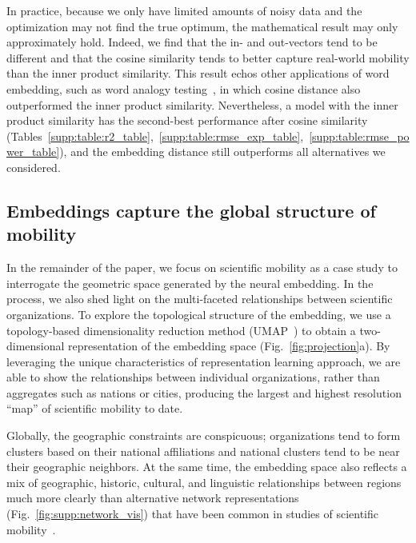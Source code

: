 \documentclass[12pt]{article} %
\begin{document}
In practice, because we only have limited amounts of noisy data and the optimization may not find the true optimum, the mathematical result may only approximately hold.
Indeed, we find that the in- and out-vectors tend to be different and that the cosine similarity tends to better capture real-world mobility than the inner product similarity.
This result echos other applications of word embedding, such as word analogy testing~\autocite{levy2015improving}, in which cosine distance also outperformed the inner product similarity.
Nevertheless, a model with the inner product similarity has the second-best performance after cosine similarity (Tables~\ref{supp:table:r2_table},~\ref{supp:table:rmse_exp_table},~\ref{supp:table:rmse_power_table}), and the embedding distance still outperforms all alternatives we considered.


\subsection*{Embeddings capture the global structure of mobility}

In the remainder of the paper, we focus on scientific mobility as a case study to interrogate the geometric space generated by the neural embedding.
In the process, we also shed light on the multi-faceted relationships between scientific organizations.
To explore the topological structure of the embedding, we use a topology-based dimensionality reduction method (UMAP~\autocite{mcinnes2018umap}) to obtain a two-dimensional representation of the embedding space (Fig.~\ref{fig:projection}a).
By leveraging the unique characteristics of representation learning approach, we are able to show the relationships between individual organizations, rather than aggregates such as nations or cities, producing the largest and highest resolution ``map'' of scientific mobility to date.

Globally, the geographic constraints are conspicuous; organizations tend to form clusters based on their national affiliations and national clusters tend to be near their geographic neighbors.
At the same time, the embedding space also reflects a mix of geographic, historic, cultural, and linguistic relationships between regions much more clearly than alternative network representations (Fig.~\ref{fig:supp:network_vis}) that have been common in studies of scientific mobility~\autocite{chinchilla2018global, czaika2018globalisation}.
\end{document}
